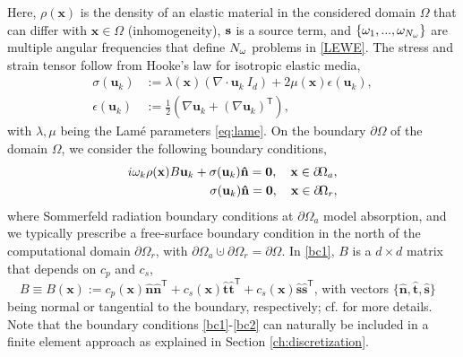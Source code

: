 Here, $\rho(\mathbf{x})$ is the density of an elastic material in the considered domain $\Omega$ that can differ with $\mathbf{x} \in \Omega$ (inhomogeneity), $\mathbf{s}$ is a source term, and $\{{\omega}_1,...,{\omega}_{N_{\omega}}\}$ are multiple angular frequencies that define ${N_{\omega}}$ problems in \eqref{LEWE}. The stress and strain tensor follow from Hooke's law for isotropic elastic media,
\begin{align}
\label{eq:Hook}
 \sigma(\mathbf{u}_k) &:= \lambda(\mathbf{x}) \left( \nabla \! \cdot \! \mathbf{u}_k \ I_d \right) + 2 \mu(\mathbf{x}) \epsilon(\mathbf{u}_k), \\
 \epsilon(\mathbf{u}_k) &:= \frac{1}{2} \left( \nabla \mathbf{u}_k + \left( \nabla \mathbf{u}_k\right)^\mathsf{T} \right),
\end{align}
  with $\lambda, \mu$ being the Lam\'e parameters \eqref{eq:lame}. On the boundary $\partial \! \Omega$ of the domain $\Omega$, we consider the following boundary conditions,
\begin{align}
i {\omega}_k \rho(\mathbf{x}) B \mathbf{u}_k + \sigma(\mathbf{u}_k)\mathbf{\hat n} = \mathbf{0}, \quad \mathbf{x} \in \partial \! \Omega_a, \label{bc1}\\
\sigma(\mathbf{u}_k)\mathbf{\hat n} = \mathbf{0}, \quad \mathbf{x} \in \partial \! \Omega_r, \label{bc2}
\end{align}
where Sommerfeld radiation boundary conditions at $\partial \! \Omega_a$ model absorption, and we typically prescribe a free-surface bound\-a\-ry condition in the north of the computational domain $\partial \! \Omega_r$, with $\partial \! \Omega_a \cupdot \partial \! \Omega_r = \partial \! \Omega$. In \eqref{bc1}, $B$ is a $d \times d$ matrix that depends on $c_p$ and $c_s$, $\quad B \equiv B(\mathbf{x}) := c_p(\mathbf{x}) \mathbf{\hat n} \mathbf{\hat n}^\mathsf{T} + c_s(\mathbf{x}) \mathbf{\hat t} \mathbf{\hat t}^\mathsf{T} + c_s(\mathbf{x}) \mathbf{\hat s} \mathbf{\hat s}^\mathsf{T}$, with vectors $\{\mathbf{\hat n},\mathbf{\hat t},\mathbf{\hat s}\}$ being normal or tangential to the bound\-a\-ry, respectively; cf. \cite{apt09} for more details. Note that the boundary conditions \eqref{bc1}-\eqref{bc2} can naturally be included in a finite element approach as explained in Section \ref{ch:discretization}.
